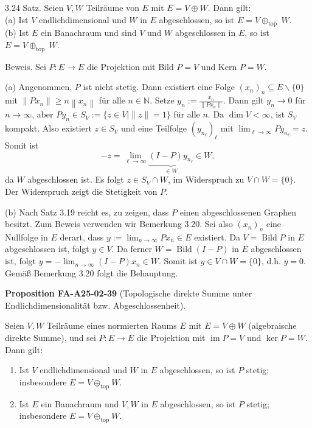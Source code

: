 \documentclass[10pt, letterpaper]{article}
\newcommand{\CustomHeading}[3]{%
  \par\medskip\noindent%
  \textbf{#1 #2} \textnormal{(#3)}.\enskip%
}
\newenvironment{PROP}[2]{\begin{unitbox}\CustomHeading{Proposition}{#1}{#2}}{\end{unitbox}}
\begin{document}
3.24 Satz. Seien $V, W$ Teilräume von $E$ mit $E=V \oplus W$. Dann gilt:\\

(a) Ist $V$ endlichdimensional und $W$ in $E$ abgeschlossen, so ist $E=V \oplus_{\text {top }} W$.\\

(b) Ist $E$ ein Banachraum und sind $V$ und $W$ abgeschlossen in $E$, so ist $E=V \oplus_{\text {top }} W$.

Beweis. Sei $P: E \rightarrow E$ die Projektion mit Bild $P=V$ und Kern $P=W$.

(a) Angenommen, $P$ ist nicht stetig. Dann existiert eine Folge $\left(x_{n}\right)_{n} \subseteq E \backslash\{0\}$ mit $\left\|P x_{n}\right\| \geq n\left\|x_{n}\right\|$ für alle $n \in \mathbb{N}$. Setze $y_{n}:=\frac{x_{n}}{\left\|P x_{n}\right\|}$. Dann gilt $y_{n} \rightarrow 0$ für $n \rightarrow \infty$, aber $P y_{n} \in S_{V}:=\{z \in V \mid\|z\|=1\}$ für alle $n$. Da $\operatorname{dim} V<\infty$, ist $S_{V}$ kompakt. Also existiert $z \in S_{V}$ und eine Teilfolge $\left(y_{n_{\ell}}\right)_{\ell}$ mit $\lim _{\ell \rightarrow \infty} P y_{n_{\ell}}=z$. Somit ist
$$
-z=\lim _{\ell \rightarrow \infty} \underbrace{(I-P) y_{n_{\ell}}}_{\in W} \in W,
$$
da $W$ abgeschlossen ist. Es folgt $z \in S_{V} \cap W$, im Widerspruch zu $V \cap W=\{0\}$. Der Widerspruch zeigt die Stetigkeit von $P$.

(b) Nach Satz 3.19 reicht es, zu zeigen, dass $P$ einen abgeschlossenen Graphen besitzt. Zum Beweis verwenden wir Bemerkung 3.20. Sei also $\left(x_{n}\right)_{n}$ eine Nullfolge in $E$ derart, dass $y:=\lim _{n \rightarrow \infty} P x_{n} \in E$ existiert. Da $V=\operatorname{Bild} P$ in $E$ abgeschlossen ist, folgt $y \in V$. Da ferner $W=\operatorname{Bild}(I-P)$ in $E$ abgeschlossen ist, folgt $y=-\lim _{n \rightarrow \infty}(I-P) x_{n} \in W$. Somit ist $y \in V \cap W=\{0\}$, d.h. $y=0$. Gemäß Bemerkung 3.20 folgt die Behauptung.



\begin{PROP}{FA-A25-02-39}{Topologische direkte Summe unter Endlichdimensionalität bzw. Abgeschlossenheit}
Seien $V,W$ Teilräume eines normierten Raums $E$ mit $E=V\oplus W$ (algebraische direkte Summe), und sei $P:E\to E$ die Projektion mit $\operatorname{im}P=V$ und $\ker P=W$. Dann gilt:
\begin{enumerate}[label=(\alph*)]
\item Ist $V$ endlichdimensional und $W$ in $E$ abgeschlossen, so ist $P$ stetig; insbesondere $E=V\oplus_{\mathrm{top}} W$.
\item Ist $E$ ein Banachraum und $V,W$ in $E$ abgeschlossen, so ist $P$ stetig; insbesondere $E=V\oplus_{\mathrm{top}} W$.
\end{enumerate}
\end{PROP}
\end{document}
